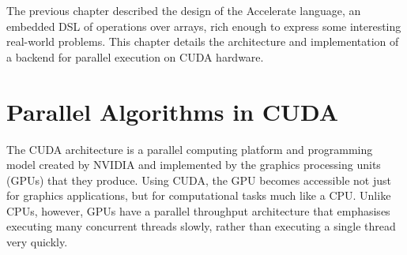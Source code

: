 

The previous chapter described the design of the Accelerate language, an
embedded DSL of operations over arrays, rich enough to express some interesting
real-world problems. This chapter details the architecture and implementation of
a backend for parallel execution on CUDA hardware.


\section{Parallel Algorithms in CUDA}

The CUDA architecture is a parallel computing platform and
programming model created by NVIDIA and implemented by the graphics processing
units (GPUs) that they produce. Using CUDA, the GPU becomes accessible not just for
graphics applications, but for computational tasks much like a CPU\@. Unlike
CPUs, however, GPUs have a parallel throughput architecture that emphasises
executing many concurrent threads slowly, rather than executing a single thread
very quickly.

